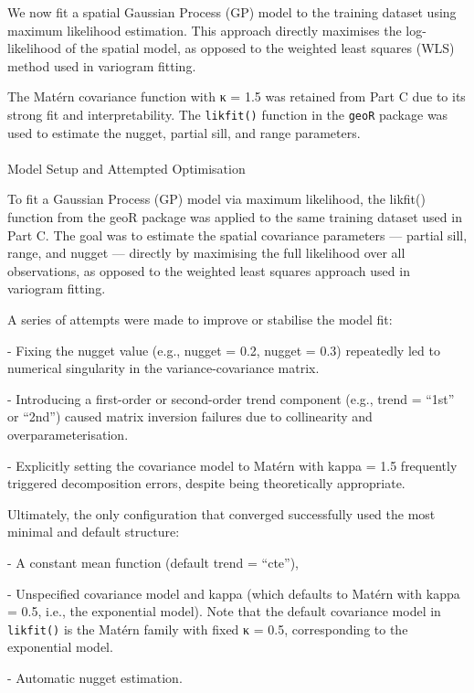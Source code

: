 \documentclass[
  11pt,
]{article}
\makeatletter
\let\oldparagraph\paragraph
\renewcommand{\paragraph}{
    \@ifstar
      \xxxParagraphStar
      \xxxParagraphNoStar
  }
\newcommand{\xxxParagraphStar}[1]{\oldparagraph*{#1}\mbox{}}
\newcommand{\xxxParagraphNoStar}[1]{\oldparagraph{#1}\mbox{}}
\makeatother
\begin{document}
We now fit a spatial Gaussian Process (GP) model to the training dataset
using maximum likelihood estimation. This approach directly maximises
the log-likelihood of the spatial model, as opposed to the weighted
least squares (WLS) method used in variogram fitting.

The Matérn covariance function with κ = 1.5 was retained from Part C due
to its strong fit and interpretability. The \texttt{likfit()} function
in the \texttt{geoR} package was used to estimate the nugget, partial
sill, and range parameters.

\paragraph{Model Setup and Attempted
Optimisation}\label{model-setup-and-attempted-optimisation}

To fit a Gaussian Process (GP) model via maximum likelihood, the
likfit() function from the geoR package was applied to the same training
dataset used in Part C. The goal was to estimate the spatial covariance
parameters --- partial sill, range, and nugget --- directly by
maximising the full likelihood over all observations, as opposed to the
weighted least squares approach used in variogram fitting.

A series of attempts were made to improve or stabilise the model fit:

- Fixing the nugget value (e.g., nugget = 0.2, nugget = 0.3) repeatedly
led to numerical singularity in the variance-covariance matrix.

- Introducing a first-order or second-order trend component (e.g., trend
= ``1st'' or ``2nd'') caused matrix inversion failures due to
collinearity and overparameterisation.

- Explicitly setting the covariance model to Matérn with kappa = 1.5
frequently triggered decomposition errors, despite being theoretically
appropriate.

Ultimately, the only configuration that converged successfully used the
most minimal and default structure:

- A constant mean function (default trend = ``cte''),

- Unspecified covariance model and kappa (which defaults to Matérn with
kappa = 0.5, i.e., the exponential model). Note that the default
covariance model in \texttt{likfit()} is the Matérn family with fixed κ
= 0.5, corresponding to the exponential model.

- Automatic nugget estimation.
\end{document}
